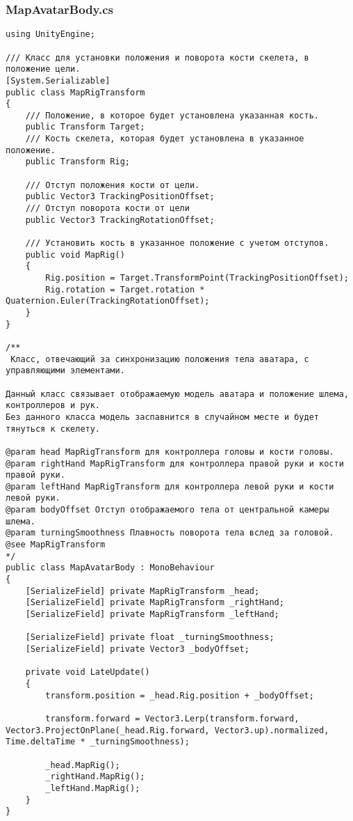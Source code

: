 \subsubsection*{MapAvatarBody.cs}
\begin{verbatim}
﻿using UnityEngine;

/// Класс для установки положения и поворота кости скелета, в положение цели.
[System.Serializable]
public class MapRigTransform
{
    /// Положение, в которое будет установлена указанная кость.
    public Transform Target;
    /// Кость скелета, которая будет установлена в указанное положение.
    public Transform Rig;

    /// Отступ положения кости от цели.
    public Vector3 TrackingPositionOffset;
    /// Отступ поворота кости от цели
    public Vector3 TrackingRotationOffset;

    /// Установить кость в указанное положение с учетом отступов.
    public void MapRig()
    {
        Rig.position = Target.TransformPoint(TrackingPositionOffset);
        Rig.rotation = Target.rotation * Quaternion.Euler(TrackingRotationOffset);
    }
}

/**
 Класс, отвечающий за синхронизацию положения тела аватара, с управляющими элементами.

Данный класс связывает отображаемую модель аватара и положение шлема, контроллеров и рук.
Без данного класса модель заспавнится в случайном месте и будет тянуться к скелету.

@param head MapRigTransform для контроллера головы и кости головы.
@param rightHand MapRigTransform для контроллера правой руки и кости правой руки.
@param leftHand MapRigTransform для контроллера левой руки и кости левой руки.
@param bodyOffset Отступ отображаемого тела от центральной камеры шлема.
@param turningSmoothness Плавность поворота тела вслед за головой.
@see MapRigTransform
*/
public class MapAvatarBody : MonoBehaviour
{
    [SerializeField] private MapRigTransform _head;
    [SerializeField] private MapRigTransform _rightHand;
    [SerializeField] private MapRigTransform _leftHand;

    [SerializeField] private float _turningSmoothness;
    [SerializeField] private Vector3 _bodyOffset;

    private void LateUpdate()
    {
        transform.position = _head.Rig.position + _bodyOffset;

        transform.forward = Vector3.Lerp(transform.forward, Vector3.ProjectOnPlane(_head.Rig.forward, Vector3.up).normalized, Time.deltaTime * _turningSmoothness);

        _head.MapRig();
        _rightHand.MapRig();
        _leftHand.MapRig();
    }
}

\end{verbatim}
